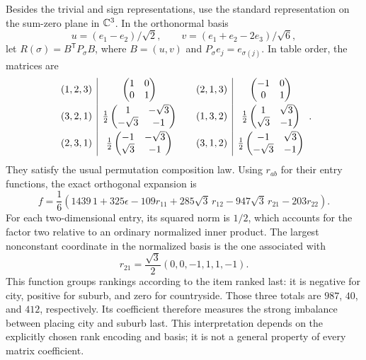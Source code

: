 Besides the trivial and sign representations, use the standard representation
on the sum-zero plane in $\mathbb{C}^3$. In the orthonormal basis
\[
 u=(e_1-e_2)/\sqrt2,\qquad v=(e_1+e_2-2e_3)/\sqrt6,
\]
let $R(\sigma)=B^{\mathsf T}P_\sigma B$, where $B=(u,v)$ and
$P_\sigma e_j=e_{\sigma(j)}$. In table order, the matrices are
\[
\begin{array}{c|c@{\qquad}c|c}
 (1,2,3)&\begin{pmatrix}1&0\\0&1\end{pmatrix}&
 (2,1,3)&\begin{pmatrix}-1&0\\0&1\end{pmatrix}\\[3mm]
 (3,2,1)&\tfrac12\begin{pmatrix}1&-\sqrt3\\-\sqrt3&-1\end{pmatrix}&
 (1,3,2)&\tfrac12\begin{pmatrix}1&\sqrt3\\\sqrt3&-1\end{pmatrix}\\[3mm]
 (2,3,1)&\tfrac12\begin{pmatrix}-1&-\sqrt3\\\sqrt3&-1\end{pmatrix}&
 (3,1,2)&\tfrac12\begin{pmatrix}-1&\sqrt3\\-\sqrt3&-1\end{pmatrix}
\end{array}.
\]
They satisfy the usual permutation composition law. Using $r_{ab}$ for
their entry functions, the exact orthogonal expansion is
\[
 f=\frac16\left(1439\,1+325\epsilon-109r_{11}
          +285\sqrt3\,r_{12}-947\sqrt3\,r_{21}-203r_{22}\right).
\]
For each two-dimensional entry, its squared norm is $1/2$, which accounts
for the factor two relative to an ordinary normalized inner product.
The largest nonconstant coordinate in the normalized basis is the one
associated with
\[
 r_{21}=\frac{\sqrt3}{2}(0,0,-1,1,1,-1).
\]
This function groups rankings according to the item ranked last: it is
negative for city, positive for suburb, and zero for countryside. Those
three totals are $987$, $40$, and $412$, respectively. Its coefficient
therefore measures the strong imbalance between placing city and suburb
last. This interpretation depends on the explicitly chosen rank encoding
and basis; it is not a general property of every matrix coefficient.

